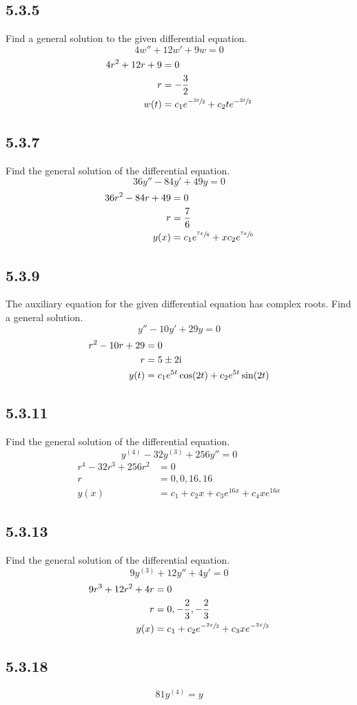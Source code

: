 \documentclass{article}
\begin{document}
\subsection{5.3.5}
Find a general solution to the given differential equation.
$$ 4w'' + 12w' + 9w = 0 $$
\begin{align*}
	4r^2 + 12r + 9 & = 0 \\
	r & = -\frac{3}{2} \\
	w(t) & = c_1e^{-\sfrac{3t}{2}} + c_2te^{-\sfrac{3t}{2}}
\end{align*}

\subsection{5.3.7}
Find the general solution of the differential equation.
$$ 36y'' - 84y' + 49y = 0 $$
\begin{align*}
	36r^2 - 84r + 49 & = 0 \\
	r & = \frac{7}{6} \\
	y(x) & = c_1e^{\sfrac{7x}{6}} + xc_2e^{\sfrac{7x}{6}}
\end{align*}

\subsection{5.3.9}
The auxiliary equation for the given differential equation has complex roots. Find a general solution.
$$ y'' - 10y' + 29y = 0 $$
\begin{align*}
	r^2 - 10r + 29 & = 0 \\
	r & = 5 \pm 2\mathrm{i}\mkern1mu \\
	y(t) & = c_1e^{5t}\cos(2t) + c_2e^{5t}\sin(2t)
\end{align*}

\subsection{5.3.11}
Find the general solution of the differential equation.
$$ y^{(4)} - 32y^{(3)} + 256y'' = 0 $$
\begin{align*}
	r^4 - 32r^3 + 256r^2 & = 0 \\
	r & = 0, 0, 16, 16 \\
	y(x) & = c_1 + c_2x + c_3e^{16x} + c_4xe^{16x}
\end{align*}

\subsection{5.3.13}
Find the general solution of the differential equation.
$$ 9y^{(3)} + 12y'' + 4y' = 0 $$
\begin{align*}
	9r^3 + 12r^2 + 4r & = 0 \\
	r & = 0, -\frac{2}{3}, -\frac{2}{3} \\
	y(x) & = c_1 + c_2e^{-\sfrac{2x}{3}} + c_3xe^{-\sfrac{2x}{3}}
\end{align*}

\subsection{5.3.18}
$$ 81y^{(4)} = y $$
\begin{align*}
\end{align*}
\end{document}
